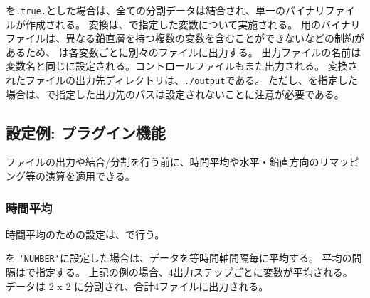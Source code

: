 を\verb|.true.|とした場合は、全ての分割データは結合され、単一のバイナリファイルが作成される。
変換は、で指定した変数について実施される。
\grads 用のバイナリファイルは、異なる鉛直層を持つ複数の変数を含むことができないなどの制約があるため、
\sno は各変数ごとに別々のファイルに出力する。
出力ファイルの名前は変数名と同じに設定される。コントロールファイルもまた出力される。
変換されたファイルの出力先ディレクトリは、\verb|./output|である。
ただし、を指定した場合は、で指定した出力先のパスは設定されないことに注意が必要である。



\subsection{設定例: プラグイン機能}

ファイルの出力や結合/分割を行う前に、時間平均や水平・鉛直方向のリマッピング等の演算を適用できる。

\subsubsection{時間平均}

時間平均のための設定は、で行う。
%


を \verb|'NUMBER'|に設定した場合は、データを等時間軸間隔毎に平均する。
平均の間隔はで指定する。
上記の例の場合、4出力ステップごとに変数が平均される。
データは 2 x 2 に分割され、合計4ファイルに出力される。

